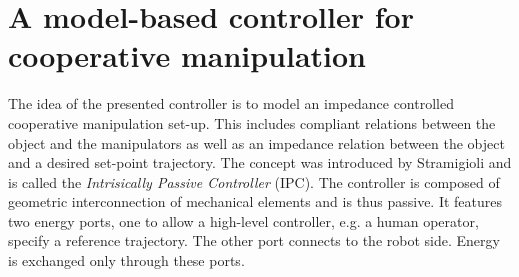 \documentclass[a4paper,twoside, openright,12pt]{report}
\begin{document}

\section{A model-based controller for cooperative manipulation}
The idea of the presented controller is to model an impedance controlled cooperative manipulation set-up. This includes compliant relations between the object and the manipulators as well as an impedance relation between the object and a desired set-point trajectory. The concept was introduced by Stramigioli \cite{Stramigioli_01} and is called the \emph{Intrisically Passive Controller} (IPC). The controller is composed of geometric interconnection of mechanical elements and is thus passive. It features two energy ports, one to allow a high-level controller, e.g. a human operator, specify a reference trajectory. The other port connects to the robot side. Energy is exchanged only through these ports.
\end{document}
